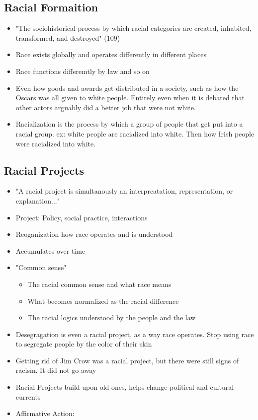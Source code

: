\documentclass{article}
\begin{document}
\subsection{Racial Formaition}
\begin{itemize}
  \item "The sociohistorical process by which racial categories are created, inhabited, transformed, and destroyed" (109)
  \item Race exists globally and operates differently in different places
  \item Race functions differemtly by law and so on
  \item Even how goods and awards get distributed in a society,
    such as how the Oscars was all given to white people. Entirely
    even when it is debated that other actors arguably did a better job that were not white.
  \item Racialization is the process by which a group of people that get put into a racial group.
    ex: white people are racialized into white. Then how
    Irish people were racialized into white.
\end{itemize}

\subsection{Racial Projects}
\begin{itemize}
  \item "A racial project is simultanously an interpreatation, representation, or explanation..."
  \item Project: Policy, social practice, interactions
  \item Reoganization how race operates and is understood
  \item Accumulates over time
  \item "Common sense"
    \begin{itemize}
      \item The racial common sense and what race means
      \item What becomes normalized as the racial difference
      \item The racial logics understood by the people and the law
    \end{itemize}
  \item Desegragation is even a racial project, as a way
    race operates.
    Stop using race to segregate people by the color of their skin
  \item Getting rid of Jim Crow was a racial project, but there were 
    still signs of racism. It did not go away
  \item Racial Projects build upon old ones, helps change political and cultural currents
  \item Affirmative Action:
\end{itemize}
\end{document}
